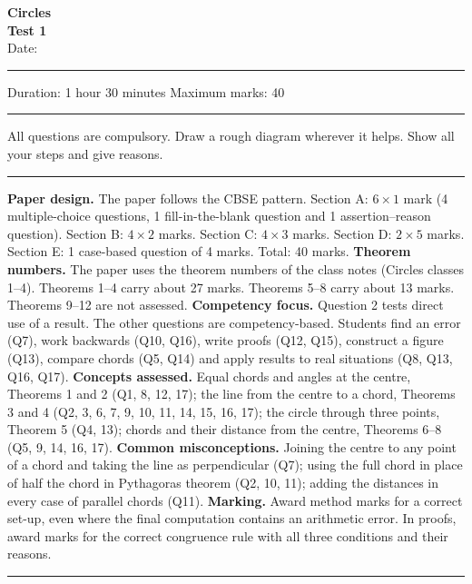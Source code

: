 \begin{center}
{\Large\bfseries Circles}\\[3pt]
{\large\bfseries Test 1}\\[5pt]
Date: \rule{3cm}{0.4pt} \quad Duration: 1 hour 30 minutes \quad Maximum marks: 40
\end{center}
\vspace{-6pt}
\noindent\rule{\linewidth}{0.6pt}\par
\vspace{3pt}
{\centering\small All questions are compulsory. Draw a rough diagram wherever it helps. Show all your steps and give reasons.\par}
\ifteacher
\vspace{4pt}
{\color{thinrule}\noindent\rule{\linewidth}{0.4pt}}\par
\vspace{4pt}
{\small\color{muted}\linespread{1.15}\selectfont
\textbf{Paper design.} The paper follows the CBSE pattern. Section A: $6\times1$ mark (4 multiple-choice questions, 1 fill-in-the-blank question and 1 assertion--reason question). Section B: $4\times2$ marks. Section C: $4\times3$ marks. Section D: $2\times5$ marks. Section E: 1 case-based question of 4 marks. Total: 40 marks.\nl
\textbf{Theorem numbers.} The paper uses the theorem numbers of the class notes (Circles classes 1--4). Theorems 1--4 carry about 27 marks. Theorems 5--8 carry about 13 marks. Theorems 9--12 are not assessed.\nl
\textbf{Competency focus.} Question 2 tests direct use of a result. The other questions are competency-based. Students find an error (Q7), work backwards (Q10, Q16), write proofs (Q12, Q15), construct a figure (Q13), compare chords (Q5, Q14) and apply results to real situations (Q8, Q13, Q16, Q17).\nl
\textbf{Concepts assessed.} Equal chords and angles at the centre, Theorems 1 and 2 (Q1, 8, 12, 17); the line from the centre to a chord, Theorems 3 and 4 (Q2, 3, 6, 7, 9, 10, 11, 14, 15, 16, 17); the circle through three points, Theorem 5 (Q4, 13); chords and their distance from the centre, Theorems 6--8 (Q5, 9, 14, 16, 17).\nl
\textbf{Common misconceptions.} Joining the centre to any point of a chord and taking the line as perpendicular (Q7); using the full chord in place of half the chord in Pythagoras theorem (Q2, 10, 11); adding the distances in every case of parallel chords (Q11).\nl
\textbf{Marking.} Award method marks for a correct set-up, even where the final computation contains an arithmetic error. In proofs, award marks for the correct congruence rule with all three conditions and their reasons.\par}
\vspace{4pt}
{\color{thinrule}\noindent\rule{\linewidth}{0.4pt}}\par
\vspace{3pt}
\fi
